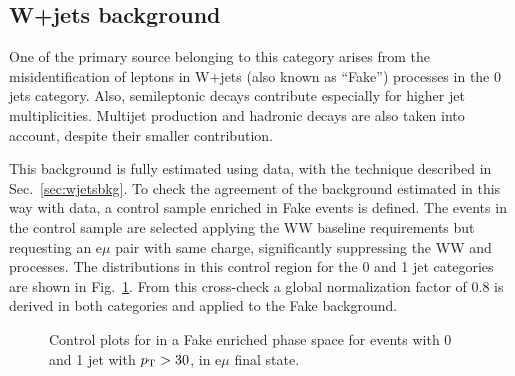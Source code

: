 \subsection{W+jets background}

One of the primary source belonging to this category arises from the misidentification of leptons in W+jets (also known as ``Fake'') processes in the 0 jets category. Also, semileptonic \ttbar decays contribute especially for higher jet multiplicities. Multijet production and hadronic \ttbar decays are also taken into account, despite their smaller contribution.

This background is fully estimated using data, with the technique described in Sec.~\ref{sec:wjetsbkg}. To check the agreement of the background estimated in this way with data, a control sample enriched in Fake events is defined. The events in the control sample are selected applying the WW baseline requirements but requesting an e$\mu$ pair with same charge, significantly suppressing the WW and \ttbar processes. The \mll distributions in this control region for the 0 and 1 jet categories are shown in Fig.~\ref{fig:13TeVsamesign}. From this cross-check a global normalization factor of 0.8 is derived in both categories and applied to the Fake background.

\begin{figure}[htb]
\centering
    \caption{
         Control plots for \mll in a Fake enriched phase space for events with 0 and 1 jet with $p_\mathrm{T} > 30$\GeV, in e$\mu$ final state.
         }\label{fig:13TeVsamesign}
\end{figure}



